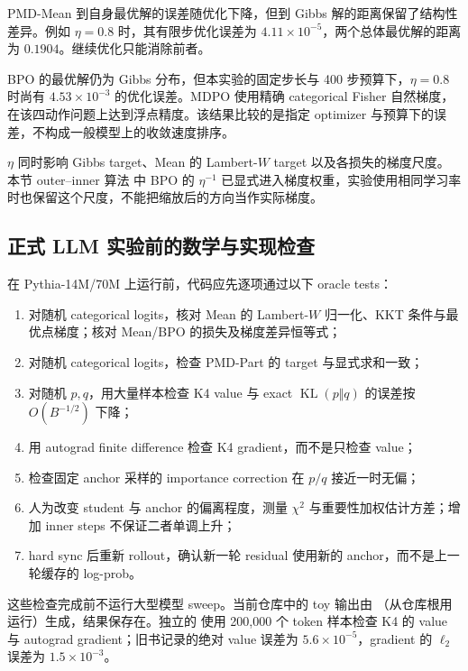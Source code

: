 \documentclass[lang=cn,scheme=chinese,openany]{../book/elegantbook}
\newcommand{\KL}{\operatorname{KL}}
\begin{document}
PMD-Mean 到自身最优解的误差随优化下降，但到 Gibbs 解的距离保留了结构性差异。例如 $\eta=0.8$ 时，其有限步优化误差为 $4.11\times10^{-5}$，两个总体最优解的距离为 $0.1904$。继续优化只能消除前者。

BPO 的最优解仍为 Gibbs 分布，但本实验的固定步长与 400 步预算下，$\eta=0.8$ 时尚有 $4.53\times10^{-3}$ 的优化误差。MDPO 使用精确 categorical Fisher 自然梯度，在该四动作问题上达到浮点精度。该结果比较的是指定 optimizer 与预算下的误差，不构成一般模型上的收敛速度排序。

$\eta$ 同时影响 Gibbs target、Mean 的 Lambert-$W$ target 以及各损失的梯度尺度。本节 outer--inner 算法 中 BPO 的 $\eta^{-1}$ 已显式进入梯度权重，实验使用相同学习率时也保留这个尺度，不能把缩放后的方向当作实际梯度。

\subsection{正式 LLM 实验前的数学与实现检查}

在 Pythia-14M/70M 上运行前，代码应先逐项通过以下 oracle tests：

\begin{enumerate}
\item 对随机 categorical logits，核对 Mean 的 Lambert-$W$ 归一化、KKT 条件与最优点梯度；核对 Mean/BPO 的损失及梯度差异恒等式；
\item 对随机 categorical logits，检查 PMD-Part 的  target 与显式求和一致；
\item 对随机 $p,q$，用大量样本检查 K4 value 与 exact $\KL(p\Vert q)$ 的误差按 $O(B^{-1/2})$ 下降；
\item 用 autograd finite difference 检查 K4 gradient，而不是只检查 value；
\item 检查固定 anchor 采样的 importance correction 在 $p/q$ 接近一时无偏；
\item 人为改变 student 与 anchor 的偏离程度，测量 $\chi^2$ 与重要性加权估计方差；增加 inner steps 不保证二者单调上升；
\item hard sync 后重新 rollout，确认新一轮 residual 使用新的 anchor，而不是上一轮缓存的 log-prob。
\end{enumerate}

这些检查完成前不运行大型模型 sweep。当前仓库中的 toy 输出由 （从仓库根用  运行）生成，结果保存在。独立的  使用 200,000 个 token 样本检查 K4 的 value 与 autograd gradient；旧书记录的绝对 value 误差为 $5.6\times10^{-5}$，gradient 的 $\ell_2$ 误差为 $1.5\times10^{-3}$。
\end{document}
